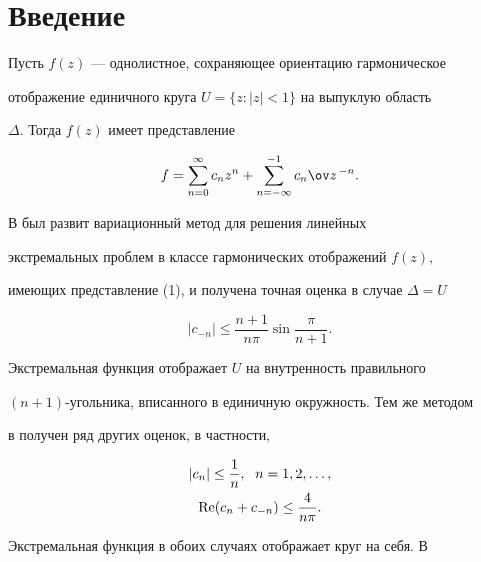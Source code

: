 \maketitle 


\label{begin} 


 


\section{Введение} 


 


Пусть $f(z)$ --- однолистное, сохраняющее ориентацию гармоническое 


отображение единичного круга $U=\{z:|z|<1\}$ на выпуклую область 


$\Delta$. Тогда $f(z)$ имеет представление 


\begin{equation} 


f=\sum^\infty_{n=0}c_n z^n+\sum^{-1}_{n=-\infty}c_n\ov z^{\,-n}. 


\end{equation} 


 


В \cite{1} был развит вариационный метод для решения линейных 


экстремальных проблем в классе гармонических отображений $f(z)$, 


имеющих представление (1), и получена точная оценка в случае $\Delta=U$ 


$$ 


|c_{-n}|\le\frac{n+1}{n\pi}\sin\frac{\pi}{n+1}. 


$$ 


Экстремальная функция отображает $U$ на внутренность правильного 


$(n{+}1)$-угольника, вписанного в единичную окружность. Тем же методом 


в \cite{2} получен ряд других оценок, в частности, 


\begin{gather*} 


|c_n|\le\frac{1}{n},\ \; n=1,2,\dotsc,\\ 


\re(c_n+c_{-n})\le\frac{4}{n\pi}. 


\end{gather*} 


Экстремальная функция в обоих случаях отображает круг на себя. В 


